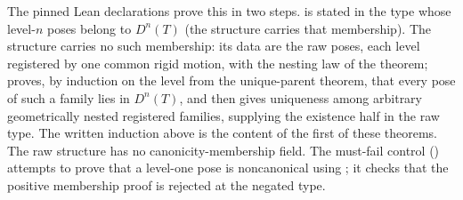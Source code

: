 The pinned Lean declarations prove this in two steps.  is stated
in the type whose level-$n$ poses belong to $D^n(T)$ (the structure 
carries that membership). The structure  carries no such membership: its
data are the raw poses, each level registered by one common rigid motion, with the nesting law of
the theorem;  proves, by induction on the level from the
unique-parent theorem, that every pose of such a family lies in $D^n(T)$, and
 then gives uniqueness among arbitrary geometrically nested
registered families,  supplying the existence half in the raw
type. The written induction above is the content of the first of these theorems. The raw
structure has no canonicity-membership field. The must-fail control
() attempts to prove that a level-one pose is
noncanonical using ; it checks that the positive membership
proof is rejected at the negated type.


